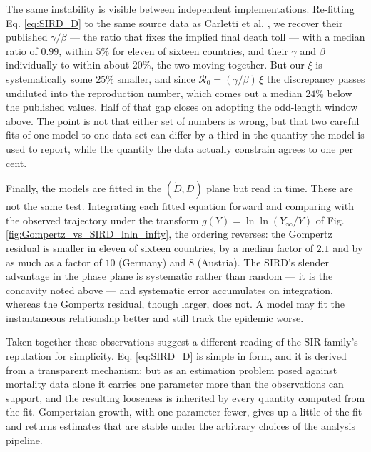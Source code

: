 \documentclass{article}
\begin{document}
The same instability is visible between independent implementations. Re-fitting
Eq. \ref{eq:SIRD_D} to the same source data as Carletti et al. \cite{carletti2020covid},
we recover their published $\gamma/\beta$ --- the ratio that fixes the implied final
death toll --- with a median ratio of $0.99$, within $5\%$ for eleven of sixteen
countries, and their $\gamma$ and $\beta$ individually to within about $20\%$, the two
moving together. But our $\xi$ is systematically some $25\%$ smaller, and since
$\mathcal{R}_0 = (\gamma/\beta)\,\xi$ the discrepancy passes undiluted into the
reproduction number, which comes out a median $24\%$ below the published values. Half of
that gap closes on adopting the odd-length window above. The point is not that either set of numbers is wrong, but
that two careful fits of one model to one data set can differ by a third in the quantity
the model is used to report, while the quantity the data actually constrain agrees to
one per cent.

Finally, the models are fitted in the $(\dot{D}, D)$ plane but read in time. These are
not the same test. Integrating each fitted equation forward and comparing with the
observed trajectory under the transform $g(Y)=\ln\ln(Y_{\infty}/Y)$ of
Fig. \ref{fig:Gompertz_vs_SIRD_lnln_infty}, the ordering reverses: the Gompertz residual
is smaller in eleven of sixteen countries, by a median factor of $2.1$ and by as much as
a factor of $10$ (Germany) and $8$ (Austria). The SIRD's slender advantage in the phase
plane is systematic rather than random --- it is the concavity noted above --- and
systematic error accumulates on integration, whereas the Gompertz residual, though
larger, does not. A model may fit the instantaneous relationship better and still track
the epidemic worse.

Taken together these observations suggest a different reading of the SIR family's
reputation for simplicity. Eq. \ref{eq:SIRD_D} is simple in form, and it is derived from
a transparent mechanism; but as an estimation problem posed against mortality data alone
it carries one parameter more than the observations can support, and the resulting
looseness is inherited by every quantity computed from the fit. Gompertzian growth, with
one parameter fewer, gives up a little of the fit and returns estimates that are stable
under the arbitrary choices of the analysis pipeline.
\end{document}
